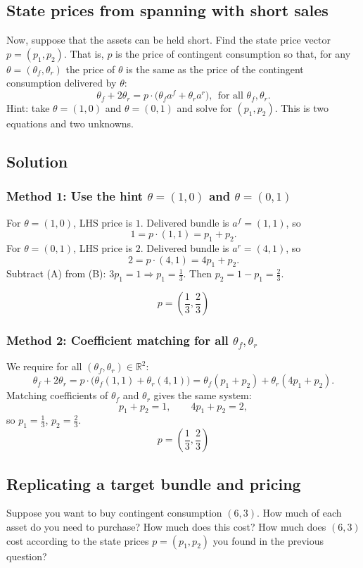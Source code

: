 \documentclass[12pt]{article}
\newcommand{\R}{\mathbb{R}}
\newcommand{\dotp}{\cdot}
\begin{document}
\subsection{State prices from spanning with short sales}
Now, suppose that the assets can be held short. Find the state price vector \(p=(p_1,p_2)\).
That is, \(p\) is the price of contingent consumption so that, for any \(\theta=(\theta_f,\theta_r)\) the price
of \(\theta\) is the same as the price of the contingent consumption delivered by \(\theta\):
\[
\theta_f+2\theta_r=p\dotp\bigl(\theta_f a^f+\theta_r a^r\bigr),\ \ \text{for all }\theta_f,\theta_r.
\]
Hint: take \(\theta=(1,0)\) and \(\theta=(0,1)\) and solve for \((p_1,p_2)\). This is two equations and two
unknowns.

\subsection*{Solution}
\subsubsection*{Method 1: Use the hint \(\theta=(1,0)\) and \(\theta=(0,1)\)}
For \(\theta=(1,0)\), LHS price is \(1\). Delivered bundle is \(a^f=(1,1)\), so
\[
1=p\dotp(1,1)=p_1+p_2. \tag{A}
\]
For \(\theta=(0,1)\), LHS price is \(2\). Delivered bundle is \(a^r=(4,1)\), so
\[
2=p\dotp(4,1)=4p_1+p_2. \tag{B}
\]
Subtract (A) from (B): \(3p_1=1\Rightarrow p_1=\frac{1}{3}\).
Then \(p_2=1-p_1=\frac{2}{3}\).

\[
\boxed{\;p=\left(\frac13,\frac23\right)\;}
\]

\subsubsection*{Method 2: Coefficient matching for all \(\theta_f,\theta_r\)}
We require for all \((\theta_f,\theta_r)\in\R^2\):
\[
\theta_f+2\theta_r
=p\dotp\bigl(\theta_f(1,1)+\theta_r(4,1)\bigr)
=\theta_f(p_1+p_2)+\theta_r(4p_1+p_2).
\]
Matching coefficients of \(\theta_f\) and \(\theta_r\) gives the same system:
\[
p_1+p_2=1,\qquad 4p_1+p_2=2,
\]
so \(p_1=\frac13\), \(p_2=\frac23\).
\[
\boxed{\;p=\left(\frac13,\frac23\right)\;}
\]

\subsection{Replicating a target bundle and pricing}
Suppose you want to buy contingent consumption \((6,3)\). How much of each asset do
you need to purchase? How much does this cost? How much does \((6,3)\) cost according
to the state prices \(p=(p_1,p_2)\) you found in the previous question?
\end{document}
